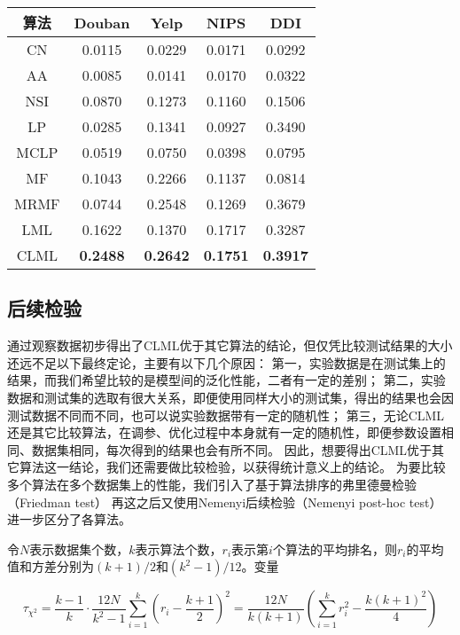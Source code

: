 \begin{center}
    \begin{tabular}{c|cccc} \hline
        算法 &	Douban & Yelp & NIPS & DDI \\ \hline
        CN  & 0.0115 & 0.0229 & 0.0171 & 0.0292 \\
        AA  & 0.0085 & 0.0141 & 0.0170 & 0.0322 \\
        NSI & 0.0870 & 0.1273 & 0.1160 & 0.1506 \\
        LP	& 0.0285 & 0.1341 & 0.0927 & 0.3490 \\
        MCLP& 0.0519 & 0.0750 & 0.0398 & 0.0795 \\
        MF  & 0.1043 & 0.2266 & 0.1137 & 0.0814 \\
        MRMF& 0.0744 & 0.2548 & 0.1269 & 0.3679 \\ \hline
        LML & 0.1622 & 0.1370 & 0.1717 & 0.3287 \\
        CLML& \bfseries 0.2488 & \bfseries 0.2642 & \bfseries 0.1751 & \bfseries 0.3917 \\ \hline
    \end{tabular}
    \label{experiments:table:aupr}
\end{center}

\subsection{后续检验}

通过观察数据初步得出了CLML优于其它算法的结论，但仅凭比较测试结果的大小还远不足以下最终定论，主要有以下几个原因：
第一，实验数据是在测试集上的结果，而我们希望比较的是模型间的泛化性能，二者有一定的差别；
第二，实验数据和测试集的选取有很大关系，即便使用同样大小的测试集，得出的结果也会因测试数据不同而不同，也可以说实验数据带有一定的随机性；
第三，无论CLML还是其它比较算法，在调参、优化过程中本身就有一定的随机性，即便参数设置相同、数据集相同，每次得到的结果也会有所不同。
因此，想要得出CLML优于其它算法这一结论，我们还需要做比较检验，以获得统计意义上的结论。
为要比较多个算法在多个数据集上的性能，我们引入了基于算法排序的弗里德曼检验（Friedman test）
再这之后又使用Nemenyi后续检验（Nemenyi post-hoc test）进一步区分了各算法\cite{yang2015evaluating}\cite{demvsar2006statistical}。


令$N$表示数据集个数，$k$表示算法个数，$r_i$表示第$i$个算法的平均排名，则$r_i$的平均值和方差分别为$(k+1)/2$和$(k^2-1)/12$。变量

\begin{equation}
    \tau_{\chi^2} =\frac{k-1}{k}\cdot\frac{12N}{k^2-1}\sum_{i=1}^k(r_i-\frac{k+1}{2})^2 =\frac{12N}{k(k+1)}(\sum_{i=1}^kr_i^2-\frac{k(k+1)^2}{4})
    \label{experiments:formula:tau}
\end{equation}

